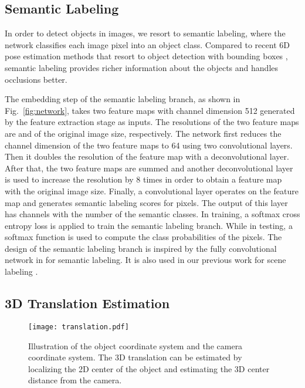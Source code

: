 \documentclass[conference]{IEEEtran}
\begin{document}
\subsection{Semantic Labeling}

In order to detect objects in images, we resort to semantic labeling, where the network classifies each image pixel into an object class. Compared to recent 6D pose estimation methods that resort to object detection with bounding boxes \cite{rad2017bb8,kehl2017ssd,tekin2017real}, semantic labeling provides richer information about the objects and handles occlusions better.

The embedding step of the semantic labeling branch, as shown in Fig.~\ref{fig:network}, takes two feature maps with channel dimension 512 generated by the feature extraction stage as inputs. The resolutions of the two feature maps are  and  of the original image size, respectively. The network first reduces the channel dimension of the two feature maps to 64 using two convolutional layers. Then it doubles the resolution of the  feature map with a deconvolutional layer. After that, the two feature maps are summed and another deconvolutional layer is used to increase the resolution by 8 times in order to obtain a feature map with the original image size. Finally, a convolutional layer operates on the feature map and generates semantic labeling scores for pixels. The output of this layer has  channels with  the number of the semantic classes. In training, a softmax cross entropy loss is applied to train the semantic labeling branch. While in testing, a softmax function is used to compute the class probabilities of the pixels. The design of the semantic labeling branch is inspired by the fully convolutional network in \cite{long2015fully} for semantic labeling. It is also used in our previous work for scene labeling \cite{xiang2017darnn}.


\subsection{3D Translation Estimation}

\begin{figure}
	\centering
	\texttt{[image: translation.pdf]}
	\caption{Illustration of the object coordinate system and the camera coordinate system. The 3D translation can be estimated by localizing the 2D center of the object and estimating the 3D center distance from the camera.}
	\label{fig:translation}
	\vspace{-6mm}
\end{figure}
\end{document}
